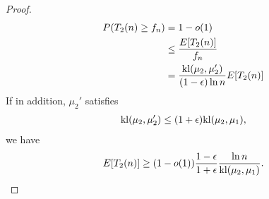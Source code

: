 \begin{proof}
\begin{align}
        P(T_2(n)\ge f_n)
            &=1-o(1) \\
            &\le \frac{E[T_2(n)]}{f_n} \\
            &= \frac{{\mathop{\mathrm{kl}}}(\mu_2,\mu_2')}{(1-\epsilon)\ln n}E[T_2(n)]
    \end{align}
    If in addition, $\mu_2'$ satisfies
    \begin{align}
        {\mathop{\mathrm{kl}}}(\mu_2, \mu_2')\le(1+\epsilon){\mathop{\mathrm{kl}}}(\mu_2,\mu_1),
    \end{align}
    we have
    \begin{align}
        E[T_2(n)]\ge(1-o(1))\frac{1-\epsilon}{1+\epsilon}\frac{\ln n}{{\mathop{\mathrm{kl}}}(\mu_2,\mu_1)}.
    \end{align}
\end{proof}
